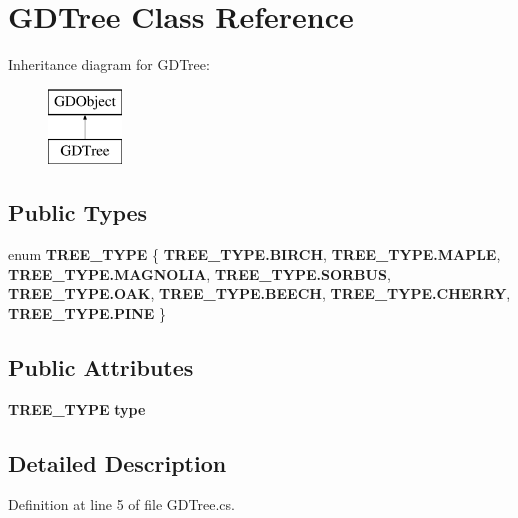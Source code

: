 \section{G\+D\+Tree Class Reference}
\label{class_g_d_tree}
Inheritance diagram for G\+D\+Tree\+:\begin{figure}[H]
\begin{center}
\leavevmode
\includegraphics[height=2.000000cm]{class_g_d_tree}
\end{center}
\end{figure}
\subsection*{Public Types}
\begin{DoxyCompactItemize}
\item 
enum \textbf{ T\+R\+E\+E\+\_\+\+T\+Y\+PE} \{ \newline
\textbf{ T\+R\+E\+E\+\_\+\+T\+Y\+P\+E.\+B\+I\+R\+CH}, 
\textbf{ T\+R\+E\+E\+\_\+\+T\+Y\+P\+E.\+M\+A\+P\+LE}, 
\textbf{ T\+R\+E\+E\+\_\+\+T\+Y\+P\+E.\+M\+A\+G\+N\+O\+L\+IA}, 
\textbf{ T\+R\+E\+E\+\_\+\+T\+Y\+P\+E.\+S\+O\+R\+B\+US}, 
\newline
\textbf{ T\+R\+E\+E\+\_\+\+T\+Y\+P\+E.\+O\+AK}, 
\textbf{ T\+R\+E\+E\+\_\+\+T\+Y\+P\+E.\+B\+E\+E\+CH}, 
\textbf{ T\+R\+E\+E\+\_\+\+T\+Y\+P\+E.\+C\+H\+E\+R\+RY}, 
\textbf{ T\+R\+E\+E\+\_\+\+T\+Y\+P\+E.\+P\+I\+NE}
 \}
\end{DoxyCompactItemize}
\subsection*{Public Attributes}
\begin{DoxyCompactItemize}
\item 
\textbf{ T\+R\+E\+E\+\_\+\+T\+Y\+PE} \textbf{ type}
\end{DoxyCompactItemize}


\subsection{Detailed Description}


Definition at line 5 of file G\+D\+Tree.\+cs.



